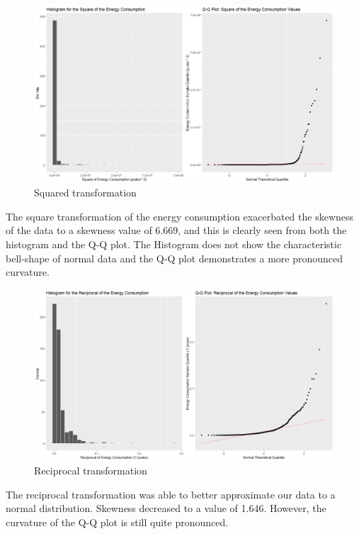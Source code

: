 \begin{figure}[H]
  \includegraphics[width=\linewidth]{./NewImages/Fig_8_Squared_Transform.png}
  \caption{Squared transformation}
  \label{fig:histqq-sqr}
\end{figure}

The square transformation of the energy consumption exacerbated the skewness of the data to a skewness value of 6.669, and this is clearly seen from both the histogram and the Q-Q plot.  The Histogram does not show the characteristic bell-shape of normal data and the Q-Q plot demonstrates a more pronounced curvature.


\begin{figure}[H]
  \includegraphics[width=\linewidth]{./NewImages/Fig_9_Reciprocal_Transform.png}
  \caption{Reciprocal transformation}
  \label{fig:histqq-rec}
\end{figure}

The reciprocal transformation was able to better approximate our data to a normal distribution. Skewness decreased to a value of 1.646. However, the curvature of the Q-Q plot is still quite pronounced.

